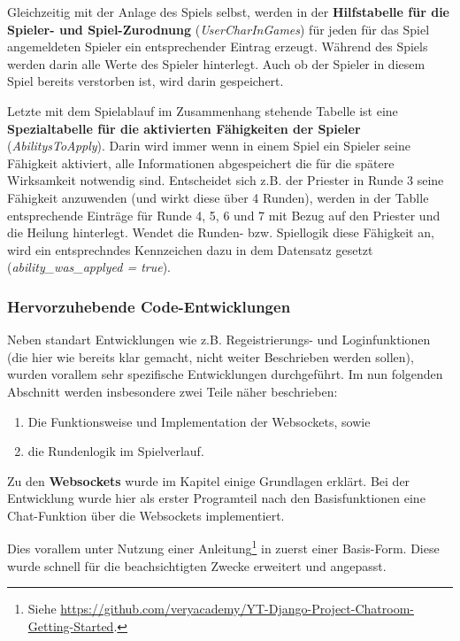 Gleichzeitig mit der Anlage des Spiels selbst, werden in der \textbf{Hilfstabelle für die Spieler- und Spiel-Zurodnung} (\textit{UserCharInGames}) für jeden für das Spiel angemeldeten Spieler ein entsprechender Eintrag erzeugt. Während des Spiels werden darin alle Werte des Spieler hinterlegt. Auch ob der Spieler in diesem Spiel bereits verstorben ist, wird darin gespeichert. 

Letzte mit dem Spielablauf im Zusammenhang stehende Tabelle ist eine \textbf{Spezialtabelle für die aktivierten Fähigkeiten der Spieler} (\textit{AbilitysToApply}). Darin wird immer wenn in einem Spiel ein Spieler seine Fähigkeit aktiviert, alle Informationen abgespeichert die für die spätere Wirksamkeit notwendig sind. Entscheidet sich z.B. der Priester in Runde 3 seine Fähigkeit anzuwenden (und wirkt diese über 4 Runden), werden in der Tablle entsprechende Einträge für Runde 4, 5, 6 und 7 mit Bezug auf den Priester und die Heilung hinterlegt. Wendet die Runden- bzw. Spiellogik diese Fähigkeit an, wird ein entsprechndes Kennzeichen dazu in dem Datensatz gesetzt (\textit{ability\_was\_applyed = true}).





\subsubsection{Hervorzuhebende Code-Entwicklungen}


Neben standart Entwicklungen wie z.B. Regeistrierungs- und Loginfunktionen (die hier wie bereits klar gemacht, nicht weiter Beschrieben werden sollen), wurden vorallem sehr spezifische Entwicklungen durchgeführt. Im nun folgenden Abschnitt werden insbesondere zwei Teile näher beschrieben: 

\begin{enumerate}
    \item Die Funktionsweise und Implementation der Websockets, sowie 
    \item die Rundenlogik im Spielverlauf.
\end{enumerate}



Zu den \textbf{Websockets} wurde im Kapitel  einige Grundlagen erklärt. Bei der Entwicklung wurde hier als erster Programteil nach den Basisfunktionen eine Chat-Funktion über die Websockets implementiert. 


Dies vorallem unter Nutzung einer Anleitung\footnote{Siehe \url{https://github.com/veryacademy/YT-Django-Project-Chatroom-Getting-Started}.} in zuerst einer Basis-Form. Diese wurde schnell für die beachsichtigten Zwecke erweitert und angepasst. 

